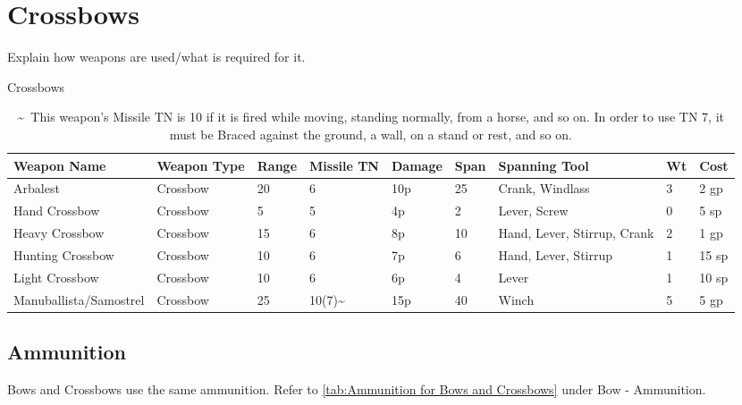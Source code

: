 \documentclass[oneside,11pt,english]{book}
\begin{document}
\section{Crossbows}
Explain how weapons are used/what is required for it. 
\begin{table} [hb] %
	\centering
	\caption{Crossbows}
	\label{tab:Crossbows}
	\begin{tabu} to \linewidth {X X[-1] X[-2,c]X[-2,c]X[-2,c]X[-2,c]  X X[-2]X[-2]}
		Weapon Name& Weapon Type & Range & Missile TN           & Damage & Span & Spanning Tool               & Wt & Cost  \\\toprule
		Arbalest&Crossbow    & 20    & 6                    & 10p    & 25   & Crank, Windlass             & 3  & 2 gp  \\
		Hand Crossbow&Crossbow    & 5     & 5                    & 4p     & 2    & Lever, Screw                & 0  & 5 sp  \\
		Heavy Crossbow&Crossbow    & 15    & 6                    & 8p     & 10   & Hand, Lever, Stirrup, Crank & 2  & 1 gp  \\
		Hunting Crossbow&Crossbow    & 10    & 6                    & 7p     & 6    & Hand, Lever, Stirrup        & 1  & 15 sp \\
		Light Crossbow&Crossbow    & 10    & 6                    & 6p     & 4    & Lever                       & 1  & 10 sp \\
		Manuballista/Samostrel&Crossbow    & 25    & 10(7)\textasciitilde & 15p    & 40   & Winch                       & 5  & 5 gp
	\end{tabu}
\vspace{5pt}	\caption*{\textasciitilde~This weapon’s Missile TN is 10 if it is fired while moving, standing normally, from a horse, and so on. In order to use TN 7, it must be Braced against the ground, a wall, on a stand or rest, and so on.}
\end{table}
\subsection{Ammunition}
Bows and Crossbows use the same ammunition. Refer to \autoref{tab:Ammunition for Bows and Crossbows} under Bow - Ammunition. %
\end{document}
